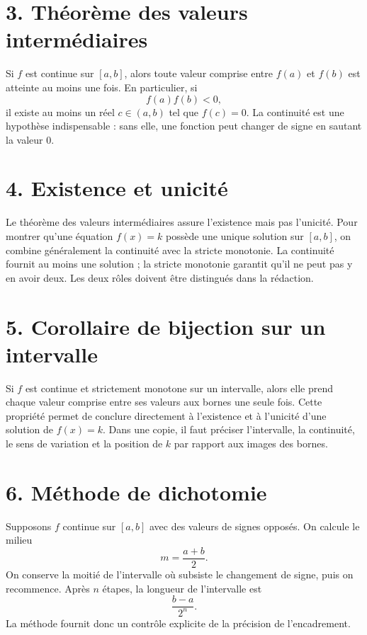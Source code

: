 
\section{3. Théorème des valeurs intermédiaires}
Si $f$ est continue sur $[a,b]$, alors toute valeur comprise entre $f(a)$ et $f(b)$ est atteinte au moins une fois. En particulier, si
\[
f(a)f(b)<0,
\]
il existe au moins un réel $c\in(a,b)$ tel que $f(c)=0$. La continuité est une hypothèse indispensable : sans elle, une fonction peut changer de signe en sautant la valeur $0$.

\section{4. Existence et unicité}
Le théorème des valeurs intermédiaires assure l'existence mais pas l'unicité. Pour montrer qu'une équation $f(x)=k$ possède une unique solution sur $[a,b]$, on combine généralement la continuité avec la stricte monotonie. La continuité fournit au moins une solution ; la stricte monotonie garantit qu'il ne peut pas y en avoir deux. Les deux rôles doivent être distingués dans la rédaction.

\section{5. Corollaire de bijection sur un intervalle}
Si $f$ est continue et strictement monotone sur un intervalle, alors elle prend chaque valeur comprise entre ses valeurs aux bornes une seule fois. Cette propriété permet de conclure directement à l'existence et à l'unicité d'une solution de $f(x)=k$. Dans une copie, il faut préciser l'intervalle, la continuité, le sens de variation et la position de $k$ par rapport aux images des bornes.


\section{6. Méthode de dichotomie}
Supposons $f$ continue sur $[a,b]$ avec des valeurs de signes opposés. On calcule le milieu
\[
m=\frac{a+b}{2}.
\]
On conserve la moitié de l'intervalle où subsiste le changement de signe, puis on recommence. Après $n$ étapes, la longueur de l'intervalle est
\[
\frac{b-a}{2^n}.
\]
La méthode fournit donc un contrôle explicite de la précision de l'encadrement.

